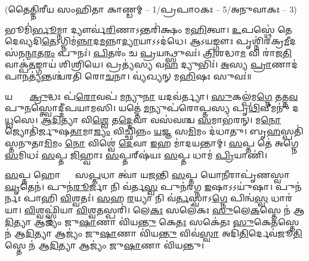 \vspace{-1ex}
\centerline{\normalsize (𑌤𑍈𑌤𑍍𑌤𑌿𑌰𑍀𑌯 𑌸𑌂𑌹𑌿𑌤𑌾 𑌕𑌾𑌣𑍍𑌡𑌮𑍍 – 1/𑌪𑍍𑌰𑌪𑌾𑌠𑌕𑌃 – 5/𑌅𑌨𑍁𑌵𑌾𑌕𑌃 – 3)}

𑌭𑍂𑌮𑌿॑\ul{𑌰𑍍𑌭𑍂}𑌮𑍍𑌨𑌾 𑌦𑍍𑌯𑍗𑌰𑍍𑌵॑\ul{𑌰𑌿}𑌣𑌾𑌽𑌨𑍍𑌤𑌰𑌿॑𑌕𑍍𑌷𑌂 𑌮\ul{𑌹𑌿}𑌤𑍍𑌵𑌾। \ul{𑌉}𑌪𑌸𑍍𑌥𑍇॑ 𑌤𑍇 𑌦𑍇𑌵𑍍𑌯𑌦𑌿\ul{𑌤𑍇}𑌽𑌗𑍍𑌨𑌿\-𑌮॑\ul{𑌨𑍍𑌨𑌾}𑌦\ul{𑌮}𑌨𑍍𑌨𑌾\ul{𑌦𑍍𑌯𑌾}𑌯𑌾𑌽𑌽𑌦॑𑌧𑍇।
𑌆𑌽𑌯𑌙𑍍𑌗𑍗𑌃 𑌪𑍃𑌶𑍍𑌨𑌿॑𑌰𑌕𑍍𑌰\ul{𑌮𑍀}\-𑌦𑌸॑𑌨\ul{𑌨𑍍𑌮𑌾}𑌤\ul{𑌰𑌂} 𑌪𑍁𑌨𑌃॑। \ul{𑌪𑌿}𑌤𑌰𑌂॑ 𑌚 \ul{𑌪𑍍𑌰}𑌯𑌨𑍍𑌥𑍍𑌸𑍁𑌵𑌃॑।
\ul{𑌤𑍍𑌰𑌿}\ul{}𑌶𑌦𑍍𑌧𑌾\ul{𑌮} 𑌵𑌿 𑌰𑌾॑𑌜\ul{𑌤𑌿} 𑌵𑌾𑌕𑍍𑌪॑\ul{𑌤}𑌙𑍍𑌗𑌾𑌯॑ 𑌶𑌿𑌶𑍍𑌰𑌿𑌯𑍇। 𑌪𑍍𑌰𑌤𑍍𑌯॑𑌸𑍍𑌯 𑌵\ul{𑌹} 𑌦𑍍𑌯𑍁𑌭𑌿𑌃॑। \ul{𑌅}𑌸𑍍𑌯 \ul{𑌪𑍍𑌰𑌾}𑌣𑌾𑌦॑𑌪𑌾\ul{𑌨}𑌤𑍍𑌯॑𑌨𑍍𑌤𑌶𑍍𑌚॑𑌰𑌤𑌿 𑌰𑍋\ul{𑌚}𑌨𑌾।
𑌵𑍍𑌯॑𑌖𑍍𑌯𑌨𑍍 𑌮\ul{𑌹𑌿}𑌷𑌃 𑌸𑍁𑌵𑌃॑॥

𑌯𑌤𑍍𑌤𑍍𑌵𑌾᳚ \ul{𑌕𑍍𑌰𑍁}𑌦𑍍𑌧𑌃 𑌪॑\ul{𑌰𑍋}𑌵𑌪॑ \ul{𑌮}𑌨𑍍𑌯𑍁\ul{𑌨𑌾} 𑌯𑌦𑌵॑𑌰𑍍𑌤𑍍𑌯𑌾। \ul{𑌸𑍁}𑌕𑌲𑍍𑌪॑𑌮\ul{𑌗𑍍𑌨𑍇} 𑌤𑌤𑍍𑌤\ul{𑌵} 𑌪𑍁\ul{𑌨}𑌸𑍍𑌤𑍍𑌵𑍋𑌦𑍍𑌦𑍀॑𑌪𑌯𑌾𑌮𑌸𑌿।
𑌯𑌤𑍍𑌤𑍇॑ \ul{𑌮}𑌨𑍍𑌯𑍁𑌪॑𑌰𑍋𑌪𑍍𑌤𑌸𑍍𑌯 𑌪𑍃\ul{𑌥𑌿}𑌵𑍀𑌮𑌨𑍁॑ 𑌦\ul{𑌧𑍍𑌵}𑌸𑍇। \ul{𑌆}\ul{𑌦𑌿}𑌤𑍍𑌯𑌾 𑌵𑌿\ul{𑌶𑍍𑌵𑍇} 𑌤\ul{𑌦𑍍𑌦𑍇}𑌵𑌾 𑌵𑌸॑𑌵𑌶𑍍𑌚 \ul{𑌸}𑌮𑌾𑌭॑𑌰𑌨𑍍।
𑌮\ul{𑌨𑍋} 𑌜𑍍𑌯𑍋𑌤𑌿॑𑌰𑍍𑌜𑍁𑌷\ul{𑌤𑌾}𑌮𑌾\ul{𑌜𑍍𑌯𑌂} 𑌵𑌿𑌚𑍍𑌛𑌿॑𑌨𑍍𑌨𑌂 \ul{𑌯}𑌜𑍍𑌞 𑌸\ul{𑌮𑌿}𑌮𑌂 𑌦॑𑌧𑌾𑌤𑍁। 𑌬𑍃\ul{𑌹}𑌸𑍍𑌪𑌤𑌿॑𑌸𑍍𑌤𑌨𑍁𑌤𑌾\ul{𑌮𑌿}𑌮𑌂 \ul{𑌨𑍋} 𑌵𑌿𑌶𑍍𑌵𑍇॑ \ul{𑌦𑍇}𑌵𑌾 \ul{𑌇}𑌹 𑌮𑌾॑𑌦𑌯𑌨𑍍𑌤𑌾𑌮𑍍।
 \ul{𑌸}𑌪𑍍𑌤 𑌤𑍇॑ 𑌅𑌗𑍍𑌨𑍇 \ul{𑌸}𑌮𑌿𑌧𑌃॑ \ul{𑌸}𑌪𑍍𑌤 \ul{𑌜𑌿}𑌹𑍍𑌵𑌾𑌃 \ul{𑌸}𑌪𑍍𑌤𑌰𑍍‌𑌷॑𑌯𑌃 \ul{𑌸}𑌪𑍍𑌤 𑌧𑌾𑌮॑ \ul{𑌪𑍍𑌰𑌿}𑌯𑌾𑌣𑌿॑। 

\ul{𑌸}𑌪𑍍𑌤 𑌹𑍋𑌤𑍍𑌰𑌾𑌃᳚ 𑌸\ul{𑌪𑍍𑌤}𑌧𑌾 𑌤𑍍𑌵𑌾॑ 𑌯𑌜𑌨𑍍𑌤𑌿 \ul{𑌸}𑌪𑍍𑌤 𑌯𑍋\ul{𑌨𑍀}𑌰𑌾𑌪𑍃॑𑌣𑌸𑍍𑌵𑌾 \ul{𑌘𑍃}𑌤𑍇𑌨॑। 𑌪𑍁𑌨॑\ul{𑌰𑍂}𑌰𑍍𑌜𑌾 𑌨𑌿 𑌵॑𑌰𑍍𑌤\ul{𑌸𑍍𑌵} 𑌪𑍁𑌨॑𑌰𑌗𑍍𑌨 \ul{𑌇}𑌷𑌾𑌽𑌽𑌯𑍁॑𑌷𑌾। 𑌪𑍁𑌨॑𑌰𑍍𑌨𑌃 𑌪𑌾𑌹𑌿 \ul{𑌵𑌿}𑌶𑍍𑌵𑌤𑌃॑। \ul{𑌸}𑌹 \ul{𑌰}𑌯𑍍𑌯𑌾 𑌨𑌿 𑌵॑\ul{𑌰𑍍𑌤}𑌸𑍍𑌵𑌾𑌽\ul{𑌗𑍍𑌨𑍇} 𑌪𑌿𑌨𑍍𑌵॑\ul{𑌸𑍍𑌵} 𑌧𑌾𑌰॑𑌯𑌾। \ul{𑌵𑌿}𑌶𑍍𑌵𑌫𑍍𑌸𑍍𑌨𑌿॑𑌯𑌾 \ul{𑌵𑌿}𑌶𑍍𑌵\ul{𑌤}𑌸𑍍𑌪𑌰𑌿॑। 𑌲𑍇\ul{𑌕𑌃} 𑌸𑌲𑍇॑𑌕𑌃 \ul{𑌸𑍁}𑌲𑍇\ul{𑌕}𑌸𑍍𑌤𑍇 𑌨॑ 𑌆\ul{𑌦𑌿}𑌤𑍍𑌯𑌾 𑌆𑌜𑍍𑌯𑌂॑ 𑌜𑍁\ul{𑌷𑌾}𑌣𑌾 𑌵𑌿॑𑌯\ul{𑌨𑍍𑌤𑍁} 𑌕𑍇\ul{𑌤𑌃} 𑌸𑌕𑍇॑𑌤𑌃 \ul{𑌸𑍁}𑌕𑍇\ul{𑌤}𑌸𑍍𑌤𑍇 𑌨॑ 𑌆\ul{𑌦𑌿}𑌤𑍍𑌯𑌾 𑌆𑌜𑍍𑌯𑌂॑ 𑌜𑍁\ul{𑌷𑌾}𑌣𑌾 𑌵𑌿॑𑌯\ul{𑌨𑍍𑌤𑍁} 𑌵𑌿𑌵॑\ul{𑌸𑍍𑌵𑌾}\ul{} 𑌅𑌦𑌿॑\ul{𑌤𑌿}𑌰𑍍𑌦𑍇𑌵॑𑌜𑍂\ul{𑌤𑌿}𑌸𑍍𑌤𑍇 𑌨॑ 𑌆\ul{𑌦𑌿}𑌤𑍍𑌯𑌾 𑌆𑌜𑍍𑌯𑌂॑ 𑌜𑍁\ul{𑌷𑌾}𑌣𑌾 𑌵𑌿॑𑌯𑌨𑍍𑌤𑍁।

